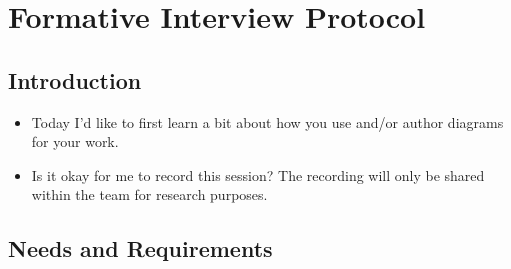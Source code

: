 \chapter{\Edgeworth{} Formative Interview Protocol}
\label{app:edgeworth-formative-protocol}

\section{Introduction}

\begin{itemize}
    \item Today I'd like to first learn a bit about how you use and/or author diagrams for your work. 
    \item Is it okay for me to record this session? The recording will only be shared within the team for research purposes.
\end{itemize}

\section{Needs and Requirements}

